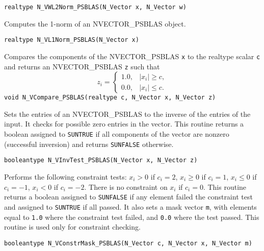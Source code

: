 \documentclass[twoside,a4paper]{refart}
\begin{document}
\begin{description}
 	 \lstinline[style=CStyle]|realtype N_VWL2Norm_PSBLAS(N_Vector x, N_Vector w)|
 	
 	\item[\fbox{\texttt{N\_VL1Norm\_PSBLAS}}] Computes the 1-norm of an NVECTOR\_PSBLAS object.
 	
 	 \lstinline[style=CStyle]|realtype N_VL1Norm_PSBLAS(N_Vector x)|
 	
 	\item[\fbox{\texttt{N\_VCompare\_PSBLAS}}] Compares the components of the NVECTOR\_PSBLAS \lstinline[style=CStyle]|x| to the realtype scalar \lstinline[style=CStyle]|c|
 	and returns an NVECTOR\_PSBLAS \lstinline[style=CStyle]|z| such that 
 	\begin{equation*}
 	z_i = \begin{cases}
 	1.0, & |x_i| \geq c,\\
 	0.0, & |x_i| \le c.
 	\end{cases}
 	\end{equation*}
 	 \lstinline[style=CStyle]|void N_VCompare_PSBLAS(realtype c, N_Vector x, N_Vector z)|
 	
 	\item[\fbox{\texttt{N\_VInvTest\_PSBLAS}}] Sets the entries of an NVECTOR\_PSBLAS to the inverse of the entries of the input. It checks for possible zero entries in the vector. This routine returns a boolean assigned to \lstinline[style=CStyle]|SUNTRUE| if all
 	components of the vector are nonzero (successful inversion) and returns \lstinline[style=CStyle]|SUNFALSE| otherwise.
 	
 	 \lstinline[style=CStyle]|booleantype N_VInvTest_PSBLAS(N_Vector x, N_Vector z)|
 	
 	\item[\fbox{\texttt{N\_VConstrMask\_PSBLAS}}] Performs the following constraint tests: $x_i > 0$ if $c_i = 2$, $x_i \geq 0$ if $c_i = 1$,
 	$x_i \leq 0$ if $c_i = -1$, $x_i < 0$ if $c_i = -2$. There is no constraint on $x_i$ if $c_i = 0$.
 	This routine returns a boolean assigned to \lstinline[style=CStyle]|SUNFALSE| if any element failed
 	the constraint test and assigned to \lstinline[style=CStyle]|SUNTRUE| if all passed. It also sets a
 	mask vector \lstinline[style=CStyle]|m|, with elements equal to \lstinline[style=CStyle]|1.0| where the constraint test failed,
 	and \lstinline[style=CStyle]|0.0| where the test passed. This routine is used only for constraint
 	checking.
 	
 	 \lstinline[style=CStyle]|booleantype N_VConstrMask_PSBLAS(N_Vector c, N_Vector x, N_Vector m)|
 	 

\end{description}
\end{document}
